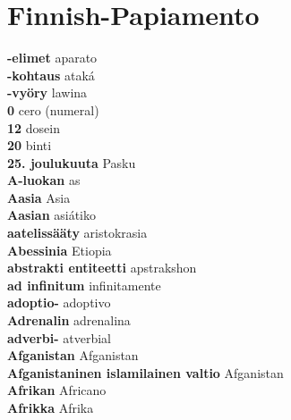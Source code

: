 \twocolumn
\chapter{Finnish-Papiamento}
\small
\raggedright
{}\textbf{ -elimet  } aparato \\
\textbf{ -kohtaus  } ataká \\
\textbf{ -vyöry  } lawina \\
\textbf{ 0  } cero (numeral) \\
\textbf{ 12  } dosein \\
\textbf{ 20  } binti \\
\textbf{ 25. joulukuuta  } Pasku \\
\textbf{ A-luokan  } as \\
\textbf{ Aasia  } Asia \\
\textbf{ Aasian  } asiátiko \\
\textbf{ aatelissääty  } aristokrasia \\
\textbf{ Abessinia  } Etiopia \\
\textbf{ abstrakti entiteetti  } apstrakshon \\
\textbf{ ad infinitum  } infinitamente \\
\textbf{ adoptio-  } adoptivo \\
\textbf{ Adrenalin  } adrenalina \\
\textbf{ adverbi-  } atverbial \\
\textbf{ Afganistan  } Afganistan \\
\textbf{ Afganistaninen islamilainen valtio  } Afganistan \\
\textbf{ Afrikan  } Africano \\
\textbf{ Afrikka  } Afrika \\
